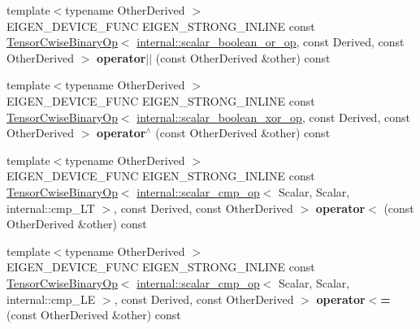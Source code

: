 \begin{DoxyCompactItemize}
{\footnotesize template$<$typename Other\+Derived $>$ }\\E\+I\+G\+E\+N\+\_\+\+D\+E\+V\+I\+C\+E\+\_\+\+F\+U\+NC E\+I\+G\+E\+N\+\_\+\+S\+T\+R\+O\+N\+G\+\_\+\+I\+N\+L\+I\+NE const \hyperlink{class_eigen_1_1_tensor_cwise_binary_op}{Tensor\+Cwise\+Binary\+Op}$<$ \hyperlink{struct_eigen_1_1internal_1_1scalar__boolean__or__op}{internal\+::scalar\+\_\+boolean\+\_\+or\+\_\+op}, const Derived, const Other\+Derived $>$ {\bfseries operator$\vert$$\vert$} (const Other\+Derived \&other) const
\item 
\mbox{\label{class_eigen_1_1_tensor_base_3_01_derived_00_01_read_only_accessors_01_4_a9452e8806aaaaf63ab7ab3cc6d9c2850}} 
{\footnotesize template$<$typename Other\+Derived $>$ }\\E\+I\+G\+E\+N\+\_\+\+D\+E\+V\+I\+C\+E\+\_\+\+F\+U\+NC E\+I\+G\+E\+N\+\_\+\+S\+T\+R\+O\+N\+G\+\_\+\+I\+N\+L\+I\+NE const \hyperlink{class_eigen_1_1_tensor_cwise_binary_op}{Tensor\+Cwise\+Binary\+Op}$<$ \hyperlink{struct_eigen_1_1internal_1_1scalar__boolean__xor__op}{internal\+::scalar\+\_\+boolean\+\_\+xor\+\_\+op}, const Derived, const Other\+Derived $>$ {\bfseries operator$^\wedge$} (const Other\+Derived \&other) const
\item 
\mbox{\label{class_eigen_1_1_tensor_base_3_01_derived_00_01_read_only_accessors_01_4_a75c3bdd27aa5c276a595608881e96e80}} 
{\footnotesize template$<$typename Other\+Derived $>$ }\\E\+I\+G\+E\+N\+\_\+\+D\+E\+V\+I\+C\+E\+\_\+\+F\+U\+NC E\+I\+G\+E\+N\+\_\+\+S\+T\+R\+O\+N\+G\+\_\+\+I\+N\+L\+I\+NE const \hyperlink{class_eigen_1_1_tensor_cwise_binary_op}{Tensor\+Cwise\+Binary\+Op}$<$ \hyperlink{struct_eigen_1_1internal_1_1scalar__cmp__op}{internal\+::scalar\+\_\+cmp\+\_\+op}$<$ Scalar, Scalar, internal\+::cmp\+\_\+\+LT $>$, const Derived, const Other\+Derived $>$ {\bfseries operator$<$} (const Other\+Derived \&other) const
\item 
\mbox{\label{class_eigen_1_1_tensor_base_3_01_derived_00_01_read_only_accessors_01_4_aa00f0d4d0712eab44eaa0cb5c1d013b4}} 
{\footnotesize template$<$typename Other\+Derived $>$ }\\E\+I\+G\+E\+N\+\_\+\+D\+E\+V\+I\+C\+E\+\_\+\+F\+U\+NC E\+I\+G\+E\+N\+\_\+\+S\+T\+R\+O\+N\+G\+\_\+\+I\+N\+L\+I\+NE const \hyperlink{class_eigen_1_1_tensor_cwise_binary_op}{Tensor\+Cwise\+Binary\+Op}$<$ \hyperlink{struct_eigen_1_1internal_1_1scalar__cmp__op}{internal\+::scalar\+\_\+cmp\+\_\+op}$<$ Scalar, Scalar, internal\+::cmp\+\_\+\+LE $>$, const Derived, const Other\+Derived $>$ {\bfseries operator$<$=} (const Other\+Derived \&other) const

\end{DoxyCompactItemize}
